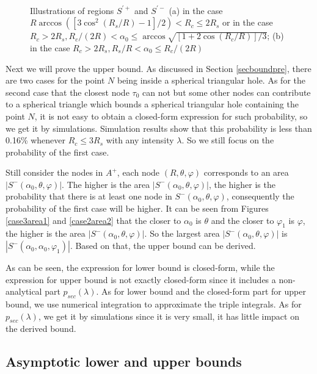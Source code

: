\documentclass[journal, twoside]{IEEEtran}
\begin{document}
\begin{figure}[ht]
  \centering {}
  \\
  \caption{Illustrations of regions $S^{'+}$ and $S^{'-}$ (a)
  	in the case $R \arccos([3\cos^2(R_s/R)-1]/2) < R_c \leq 2R_s$
  	or in the case $R_c > 2R_s, R_c/(2R) < \alpha_0 \leq \arccos \sqrt{[1+2\cos(R_c/R)]/3}$;
  	(b) in the case $R_c > 2R_s, R_s/R < \alpha_0 \leq R_c/(2R)$ }
  \label{case2area3}
\end{figure}




Next we will prove the upper bound. As discussed in Section \ref{secboundpre},
there are two cases for the point $N$ being inside a spherical triangular hole. As for the 
second case that the closest node $\tau_0$ can not but some other nodes
can contribute to a spherical triangle which bounds a spherical triangular hole containing
the point $N$, it is not easy to obtain a closed-form expression for such
probability, so we get it by simulations. Simulation results show
that this probability is less than 0.16\% whenever $R_c \leq 3R_s$ with any 
intensity $\lambda$. So we still focus on the probability of the first
case.

Still consider the nodes in $A^+$, each node $(R, \theta, \varphi)$ corresponds to 
an area $|S^- (\alpha_0, \theta, \varphi)|$. The higher is the area $|S^- (\alpha_0, \theta, \varphi)|$, 
the higher is the probability that there is at least one node in 
$S^- (\alpha_0, \theta, \varphi)$, consequently the probability of the first case
will be higher. It can be seen from Figures \ref{case3area1} and \ref{case2area2} that the closer to 
$\alpha_0$ is $\theta$ and the closer to $\varphi_1$ is $\varphi$, the higher  
is the area  $|S^- (\alpha_0, \theta, \varphi)|$. So the largest area 
$|S^- (\alpha_0, \theta, \varphi)|$ is  $|S^- (\alpha_0, \alpha_0, \varphi_1)|$.
Based on that, the upper bound can be derived. 

As can be seen, the expression for lower bound is closed-form, while the expression for upper bound is not 
exactly closed-form since it includes a non-analytical part $p_{sec}(\lambda) $. As for lower bound and the 
closed-form part for upper bound, we use numerical integration to approximate the triple integrals. As for 
$p_{sec}(\lambda) $, we get it by simulations since it is very small, it has little impact on the derived bound.


\subsection{Asymptotic lower and upper bounds}
\end{document}
